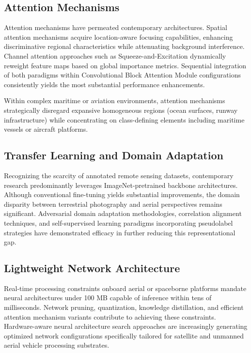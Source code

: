 \documentclass[12pt,a4paper]{article}
\begin{document}
\subsection{Attention Mechanisms}
Attention mechanisms have permeated contemporary architectures. Spatial attention mechanisms acquire location-aware focusing capabilities, enhancing discriminative regional characteristics while attenuating background interference. Channel attention approaches such as Squeeze-and-Excitation dynamically reweight feature maps based on global importance metrics. Sequential integration of both paradigms within Convolutional Block Attention Module configurations consistently yields the most substantial performance enhancements.

Within complex maritime or aviation environments, attention mechanisms strategically disregard expansive homogeneous regions (ocean surfaces, runway infrastructure) while concentrating on class-defining elements including maritime vessels or aircraft platforms.

\subsection{Transfer Learning and Domain Adaptation}
Recognizing the scarcity of annotated remote sensing datasets, contemporary research predominantly leverages ImageNet-pretrained backbone architectures. Although conventional fine-tuning yields substantial improvements, the domain disparity between terrestrial photography and aerial perspectives remains significant. Adversarial domain adaptation methodologies, correlation alignment techniques, and self-supervised learning paradigms incorporating pseudolabel strategies have demonstrated efficacy in further reducing this representational gap.

\subsection{Lightweight Network Architecture}
Real-time processing constraints onboard aerial or spaceborne platforms mandate neural architectures under 100 MB capable of inference within tens of milliseconds. Network pruning, quantization, knowledge distillation, and efficient attention mechanism variants contribute to achieving these constraints. Hardware-aware neural architecture search approaches are increasingly generating optimized network configurations specifically tailored for satellite and unmanned aerial vehicle processing substrates.
\end{document}
